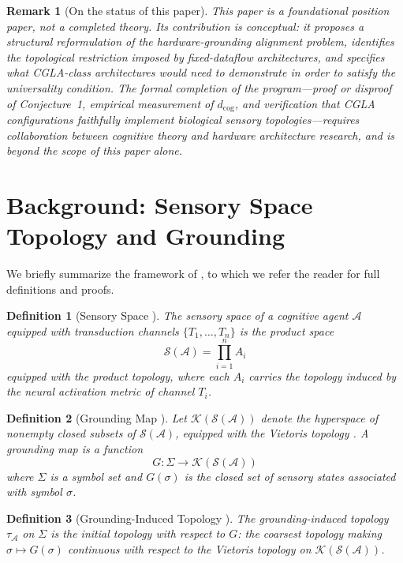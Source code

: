 \documentclass[12pt]{article}
\newtheorem{definition}{Definition}
\newtheorem{remark}{Remark}
\begin{document}
\begin{remark}[On the status of this paper]
This paper is a \emph{foundational position paper}, not a completed
theory. Its contribution is conceptual: it proposes a structural
reformulation of the hardware-grounding alignment problem, identifies
the topological restriction imposed by fixed-dataflow architectures,
and specifies what CGLA-class architectures would need to demonstrate
in order to satisfy the universality condition. The formal completion
of the program---proof or disproof of Conjecture~1, empirical
measurement of $d_{\mathrm{cog}}$, and verification that CGLA
configurations faithfully implement biological sensory
topologies---requires collaboration between cognitive theory and
hardware architecture research, and is beyond the scope of this paper
alone.
\end{remark}

\section{Background: Sensory Space Topology and Grounding}

We briefly summarize the framework of \cite{minamoto2026topology}, to which we
refer the reader for full definitions and proofs.

\begin{definition}[Sensory Space \cite{minamoto2026topology}]
The \emph{sensory space} of a cognitive agent $\mathcal{A}$ equipped with
transduction channels $\{T_1, \ldots, T_n\}$ is the product space
\[
\mathcal{S}(\mathcal{A}) = \prod_{i=1}^{n} A_i
\]
equipped with the product topology, where each $A_i$ carries the topology
induced by the neural activation metric of channel $T_i$.
\end{definition}

\begin{definition}[Grounding Map \cite{minamoto2026topology}]
Let $\mathcal{K}(\mathcal{S}(\mathcal{A}))$ denote the hyperspace of
nonempty closed subsets of $\mathcal{S}(\mathcal{A})$, equipped with the
Vietoris topology \cite{vietoris1922}. A \emph{grounding map} is a
function
\[
G: \Sigma \to \mathcal{K}(\mathcal{S}(\mathcal{A}))
\]
where $\Sigma$ is a symbol set and $G(\sigma)$ is the closed set of
sensory states associated with symbol $\sigma$.
\end{definition}

\begin{definition}[Grounding-Induced Topology \cite{minamoto2026topology}]
The \emph{grounding-induced topology} $\tau_{\mathcal{A}}$ on $\Sigma$
is the initial topology with respect to $G$: the coarsest topology making
$\sigma \mapsto G(\sigma)$ continuous with respect to the Vietoris
topology on $\mathcal{K}(\mathcal{S}(\mathcal{A}))$.
\end{definition}
\end{document}
